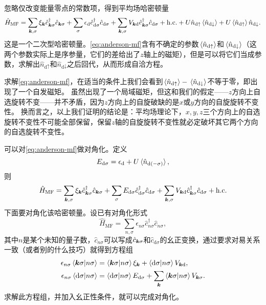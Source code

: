 \documentclass[hyperref, UTF8, a4paper]{ctexart}
\begin{document}
忽略仅改变能量零点的常数项，得到平均场哈密顿量
\begin{equation}
    \hat{H}_\text{MF} = \sum_{\vb*{k}, \sigma} \xi_{\vb*{k}} \hat{c}_{\vb*{k}\sigma}^\dagger \hat{c}_{\vb*{k} \sigma} + \sum_\sigma \epsilon_\text{d} \hat{c}_{\text{d}\sigma}^\dagger \hat{c}_{\text{d} \sigma} + \sum_{\vb*{k}, \sigma} V_{\vb*{k} \text{d}} \hat{c}_{\vb*{k} \sigma}^\dagger \hat{c}_{\text{d} \sigma} + \text{h.c.} + U \hat{n}_{\text{d} \uparrow} \expval*{\hat{n}_{\text{d} \downarrow}} + U \expval*{\hat{n}_{\text{d} \uparrow}} \hat{n}_{\text{d} \downarrow}.
    \label{eq:anderson-mf}
\end{equation}
这是一个二次型哈密顿量。\eqref{eq:anderson-mf}含有不确定的参数$\expval*{\hat{n}_{\text{d} \uparrow}}$和$\expval*{\hat{n}_{\text{d} \downarrow}}$（这两个参数实际上是序参量，它们的差给出了$z$轴上的磁矩），但是可以将它们当成参数，求解出$\hat{n}_{\text{d} \uparrow}$和$\hat{n}_{\text{d} \downarrow}$之后回代，从而形成自洽方程。

求解\eqref{eq:anderson-mf}，在适当的条件上我们会看到$\expval*{\hat{n}_{\text{d} \uparrow}} - \expval*{\hat{n}_{\text{d} \downarrow}}$不等于零，即出现了一个自发磁矩。
虽然出现了一个局域磁矩，但这和我们的假定——$z$方向上自选旋转不变——并不矛盾，因为$z$方向上的自旋破缺的是$x$或$y$方向的自旋旋转不变性。
换而言之，以上我们证明的结论是：平均场理论下，$x, y, z$三个方向上的自选旋转不变性不可能全部保留，保留$z$轴的自旋旋转不变性就必定破坏其它两个方向的自选旋转不变性。

可以对\eqref{eq:anderson-mf}做对角化。定义
\begin{equation}
    E_{\text{d} \sigma} = \epsilon_\text{d} + U \expval*{\hat{n}_{\text{d} (-\sigma)}},
    \label{eq:energy-d-sigma}
\end{equation}
则
\begin{equation}
    \hat{H}_\text{MF} = \sum_{\vb*{k}, \sigma} \xi_{\vb*{k}} \hat{c}_{\vb*{k}\sigma}^\dagger \hat{c}_{\vb*{k} \sigma} + \sum_\sigma E_{\text{d} \sigma} \hat{c}_{\text{d}\sigma}^\dagger \hat{c}_{\text{d} \sigma} + \sum_{\vb*{k}, \sigma} V_{\vb*{k} \text{d}} \hat{c}_{\vb*{k} \sigma}^\dagger \hat{c}_{\text{d} \sigma} + \text{h.c.}
\end{equation}
下面要对角化该哈密顿量。设已有对角化形式
\[
    \hat{H}_\text{MF} = \sum_{n, \sigma} \epsilon_{n \sigma} \hat{c}^\dagger_{n\sigma} \hat{c}_{n\sigma},
\]
其中$n$是某个未知的量子数，$\hat{c}_{n \sigma}$可以写成$\hat{c}_{\vb*{k} \sigma}$和$\hat{c}_{\text{d} \sigma}$的幺正变换，通过要求对易关系一致（或者别的什么技巧）就得到方程组
\begin{equation}
    \begin{aligned}
        \epsilon_{n\sigma} \braket{\vb*{k}\sigma}{n \sigma} &= \braket{\vb*{k} \sigma}{n \sigma} \xi_{\vb*{k}} + \braket{\text{d} \sigma}{n \sigma} V_{\vb*{k} \text{d}}, \\
        \epsilon_{n \sigma} \braket{\text{d} \sigma}{n \sigma} &= \braket{\text{d} \sigma}{n \sigma} E_{\text{d} \sigma} + \sum_{\vb*{k}} \braket{\vb*{k} \sigma}{n \sigma} V_{\vb*{k} \sigma}.
    \end{aligned}
\end{equation}
求解此方程组，并加入幺正性条件，就可以完成对角化。
\end{document}
